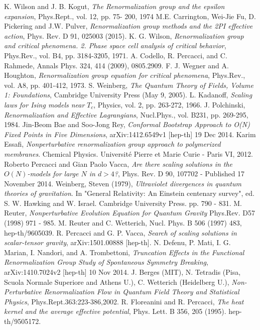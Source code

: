 \begin{thebibliography}{10}
K. Wilson and J. B. Kogut, \emph{The Renormalization group and the epsilon expansion}, Phys.Rept., vol. 12, pp. 75- 200, 1974
M.E. Carrington, Wei-Jie Fu, D. Pickering and J.W. Pulver, \emph{Renormalization group methods and the 2PI effective action}, Phys. Rev. D 91, 025003 (2015).
K. G. Wilson, \emph{Renormalization group and critical phenomena. 2. Phase space cell analysis of critical behavior}, Phys.Rev., vol. B4, pp. 3184-3205, 1971.
A. Codello, R. Percacci, and C. Rahmede, Annals Phys. 324, 414 (2009), 0805.2909.
F. J. Wegner and A. Houghton, \emph{Renormalization group equation for critical phenomena}, Phys.Rev., vol. A8, pp. 401-412, 1973.
S. Weinberg, \emph{The Quantum Theory of Fields, Volume 1: Foundations},  Cambridge University Press (May 9, 2005).
L. Kadanoff, \emph{Scaling laws for Ising models near} $T_c$, Physics, vol. 2, pp. 263-272, 1966.
J. Polchinski, \emph{Renormalization and Effective Lagrangians}, Nucl.Phys., vol. B231, pp. 269-295, 1984.
Jin-Beom Bae and Soo-Jong Rey, \emph{Conformal Bootstrap Approach to O(N) Fixed Points in Five Dimensions}, arXiv:1412.6549v1 [hep-th] 19 Dec 2014.
Karim Essafi, \emph{Nonperturbative renormalization group approach to polymerized membranes}. Chemical Physics. Universit\'e Pierre et Marie Curie - Paris VI, 2012. 
Roberto Percacci and Gian Paolo Vacca, \emph{Are there scaling solutions in the $O(N)$-models for large $N$ in $d>4$?}, Phys. Rev. D 90, 107702 - Published 17 November 2014.
Weinberg, Steven (1979), \emph{Ultraviolet divergences in quantum theories of gravitation}. In "General Relativity: An Einstein centenary survey", ed. S. W. Hawking and W. Israel. Cambridge University Press. pp. 790 - 831.
M. Reuter, \emph{Nonperturbative Evolution Equation for Quantum Gravity} Phys.Rev. D57 (1998) 971 - 985.
M. Reuter and C. Wetterich, Nucl. Phys. B 506 (1997) 483, hep-th/9605039.
R. Percacci and G. P. Vacca, \emph{Search of scaling solutions in scalar-tensor gravity},  arXiv:1501.00888 [hep-th].
N. Defenu, P. Mati, I. G. Marian, I. Nandori, and A. Trombettoni, \emph{Truncation Effects in the Functional Renormalization Group Study of Spontaneous Symmetry Breaking}, arXiv:1410.7024v2 [hep-th] 10 Nov 2014.
J. Berges (MIT), N. Tetradis (Pisa, Scuola Normale Superiore and Athens U.), C. Wetterich (Heidelberg U.), \emph{Non-Perturbative Renormalization Flow in Quantum Field Theory and Statistical Physics}, Phys.Rept.363:223-386,2002.
R. Floreanini and R. Percacci, \emph{The heat kernel and the average effective potential}, Phys. Lett.  B 356, 205 (1995). hep-th/9505172.



\end{thebibliography}
